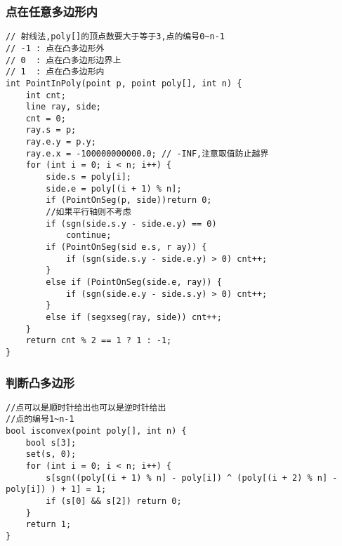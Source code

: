 \documentclass[a4paper]{article}
\begin{document}
\subsubsection{点在任意多边形内}
\begin{lstlisting}
// 射线法,poly[]的顶点数要大于等于3,点的编号0~n-1
// -1 : 点在凸多边形外
// 0  : 点在凸多边形边界上
// 1  : 点在凸多边形内
int PointInPoly(point p, point poly[], int n) {
	int cnt;
	line ray, side;
	cnt = 0;
	ray.s = p;
	ray.e.y = p.y;
	ray.e.x = -100000000000.0; // -INF,注意取值防止越界
	for (int i = 0; i < n; i++) {
		side.s = poly[i];
		side.e = poly[(i + 1) % n];
		if (PointOnSeg(p, side))return 0;
		//如果平行轴则不考虑
		if (sgn(side.s.y - side.e.y) == 0)
			continue;
		if (PointOnSeg(sid e.s, r ay)) {
			if (sgn(side.s.y - side.e.y) > 0) cnt++;
		}
		else if (PointOnSeg(side.e, ray)) {
			if (sgn(side.e.y - side.s.y) > 0) cnt++;
		}
		else if (segxseg(ray, side)) cnt++;
	}
	return cnt % 2 == 1 ? 1 : -1;
}
\end{lstlisting}
\subsubsection{判断凸多边形}
\begin{lstlisting}
//点可以是顺时针给出也可以是逆时针给出
//点的编号1~n-1
bool isconvex(point poly[], int n) {
	bool s[3];
	set(s, 0);
	for (int i = 0; i < n; i++) {
		s[sgn((poly[(i + 1) % n] - poly[i]) ^ (poly[(i + 2) % n] - poly[i]) ) + 1] = 1;
		if (s[0] && s[2]) return 0;
	}
	return 1;
}
\end{lstlisting}
\end{document}
